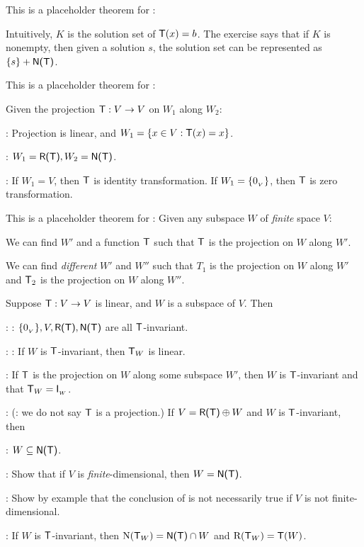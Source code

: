 \begin{additional theorem} \label{athm 2.6}
This is a placeholder theorem for :

Intuitively, \(K\) is the solution set of \(\textsf{T}(x) = b\).
The exercise says that if \(K\) is nonempty, then given a solution \(s\), the solution set can be represented as \(\{ s \} + \textsf{N(T)}\).
\end{additional theorem}

\begin{additional theorem} \label{athm 2.7}
This is a placeholder theorem for :

Given the projection \(\textsf{T} : V \to V\) on \(W_1\) along \(W_2\):

: Projection is linear, and \(W_1 = \{ x \in V: \textsf{T}(x) = x \}\).

: \(W_1 = \textsf{R(T)}, W_2 = \textsf{N(T)}\).

: If \(W_1 = V\), then \(\textsf{T}\) is identity transformation.
If \(W_1 = \{ 0_{_V} \}\), then \(\textsf{T}\) is zero transformation.
\end{additional theorem}

\begin{additional theorem} \label{athm 2.8}
This is a placeholder theorem for :
Given any subspace \(W\) of \emph{finite} space \(V\):

 We can find \(W'\) and a function \(\textsf{T}\) such that \(\textsf{T}\) is the projection on \(W\) along \(W'\).

 We can find \emph{different} \(W'\) and \(W''\) such that \(T_1\) is the projection on \(W\) along \(W'\) and \(\textsf{T}_2\) is the projection on \(W\) along \(W''\).
\end{additional theorem}

\begin{additional theorem} \label{athm 2.9}
Suppose \(\textsf{T} : V \to V\) is linear, and \(W\) is a subspace of \(V\).
Then

: : \(\{ 0_{_V} \}, V, \textsf{R(T)}, \textsf{N(T)}\) are all \(\textsf{T}\)-invariant.

: : If \(W\) is \(\textsf{T}\)-invariant, then \(\textsf{T}_W\) is linear.

 : If \(\textsf{T}\) is the projection on \(W\) along some subspace \(W'\), then \(W\) is \(\textsf{T}\)-invariant and that \(\textsf{T}_W = \textsf{I}_{_W}\).

: (: we do not say \(\textsf{T}\) is a projection.)
If \(V = \textsf{R(T)} \oplus W\) and \(W\) is \(\textsf{T}\)-invariant, then

: \(W \subseteq \textsf{N(T)}\).

: Show that if \(V\) is \emph{finite}-dimensional, then \(W = \textsf{N(T)}\).

: Show by example that the conclusion of  is not necessarily true if \(V\) is not finite-dimensional.


:
If \(W\) is \(\textsf{T}\)-invariant, then \(\mathrm{N}(\textsf{T}_W) = \textsf{N(T)} \cap W\) and \(\mathrm{R}(\textsf{T}_W) = \textsf{T}(W)\).
\end{additional theorem}

